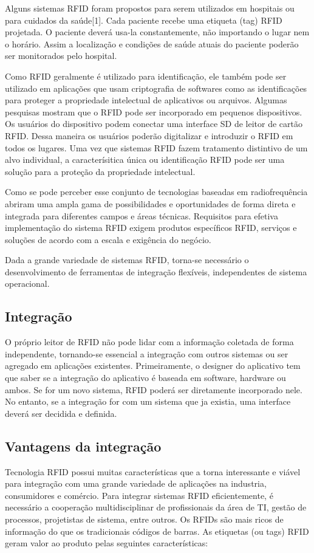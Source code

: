 	
	
		Alguns sistemas RFID foram propostos para serem utilizados em hospitais ou para cuidados da saúde[1]. Cada paciente recebe uma etiqueta (tag) RFID projetada. O paciente deverá usa-la constantemente, não importando o lugar nem o horário. Assim a localização e condições de saúde atuais do paciente poderão ser monitorados pelo hospital.
	
		Como RFID geralmente é utilizado para identificação, ele também pode ser utilizado em aplicações que usam criptografia de softwares como as identificações para proteger a propriedade intelectual de aplicativos ou arquivos. Algumas pesquisas mostram que o RFID pode ser incorporado em pequenos dispositivos. Os usuários do dispositivo podem conectar uma interface SD de leitor de cartão RFID. Dessa maneira os usuários poderão digitalizar e introduzir o RFID em todos os lugares. Uma vez que sistemas RFID fazem tratamento distintivo de um alvo individual, a caracterísitica única ou identificação RFID pode ser uma solução para a proteção da propriedade intelectual.
	
		Como se pode perceber esse conjunto de tecnologias baseadas em radiofrequência abriram uma ampla gama de possibilidades e oportunidades de forma direta e integrada para diferentes campos e áreas técnicas. Requisitos para efetiva implementação do sistema RFID exigem produtos específicos RFID, serviços e soluções de acordo com a escala e exigência do negócio.
		
		Dada a grande variedade de sistemas RFID, torna-se necessário o desenvolvimento de ferramentas de integração flexíveis, independentes de sistema operacional.
		
		
	
		
\subsection{Integração}
		O próprio leitor de RFID não pode lidar com a informação coletada de forma independente, tornando-se essencial a integração com outros sistemas ou ser agregado em aplicações existentes. Primeiramente, o designer do aplicativo tem que saber se a integração do aplicativo é baseada em software, hardware ou ambos. Se for um novo sistema, RFID poderá ser diretamente incorporado nele. No entanto, se a integração for com um sistema que ja existia, uma interface deverá ser decidida e definida.
		
		
\subsection{Vantagens da integração}
		Tecnologia RFID possui muitas características que a torna interessante e viável para integração com uma grande variedade de aplicações na industria, consumidores e comércio. Para integrar sistemas RFID eficientemente, é necessário a cooperação multidisciplinar de profissionais da área de TI, gestão de processos, projetistas de sistema, entre outros. Os RFIDs são mais ricos de informação do que os tradicionais códigos de barras. As etiquetas (ou tags) RFID geram valor ao produto pelas seguintes características:
		
